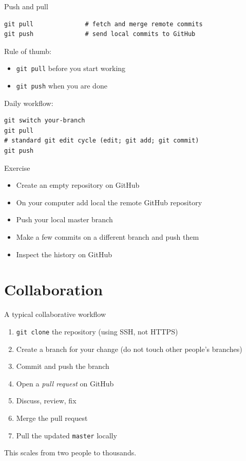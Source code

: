 \documentclass[11pt]{beamer}
\newcommand{\exercise}[1]{
  \begin{frame}{Exercise}
    #1
  \end{frame}
}
\begin{document}
\begin{frame}[fragile]{Push and pull}
\begin{lstlisting}
git pull              # fetch and merge remote commits
git push              # send local commits to GitHub
\end{lstlisting}
  \vfill
  Rule of thumb:
  \begin{itemize}
  \item \texttt{git pull} before you start working
  \item \texttt{git push} when you are done
  \end{itemize}
  \vfill
  Daily workflow:
\begin{lstlisting}
git switch your-branch
git pull
# standard git edit cycle (edit; git add; git commit)
git push
\end{lstlisting}
\end{frame}

\exercise{
  \begin{itemize}
  \item Create an empty repository on GitHub
  \item On your computer add local the remote GitHub repository
  \item Push your local master branch
  \item Make a few commits on a different branch and push them
  \item Inspect the history on GitHub
  \end{itemize}
}


\section{Collaboration}

\begin{frame}{A typical collaborative workflow}
  \begin{enumerate}
  \item \texttt{git clone} the repository (using SSH, not HTTPS)
    \item Create a branch for your change (do not touch other people's branches)
    \item Commit and push the branch
    \item Open a \emph{pull request} on GitHub
    \item Discuss, review, fix
    \item Merge the pull request
    \item Pull the updated \texttt{master} locally
  \end{enumerate}
  \vfill
  This scales from two people to thousands.
\end{frame}
\end{document}
